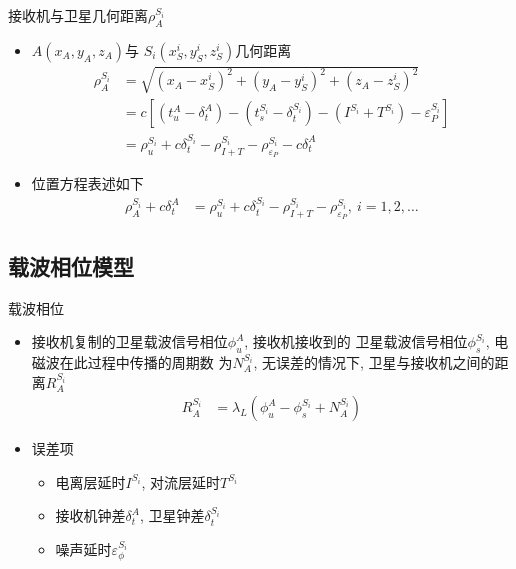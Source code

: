 \begin{frame}{接收机与卫星几何距离$\rho _ A ^ { S _ i }$}
    \begin{itemize}
        \item $A \left( x _ A, y _ A, z _ A \right)$与
        $S _ i \left( x _ S ^ i, y _ S ^ i, z _ S ^ i \right)$几何距离
        \begin{align*}
            \rho _ A ^ { S _ i } &= \sqrt{ \left( x _ A - x _ S ^ i \right) ^ 2 
            + \left( y _ A - y _ S ^ i \right) ^ 2 
            + \left( z _ A - z _ S ^ i \right) ^ 2 } \\
            &= c \left[ \left( t _ u ^ A - \delta _ t ^ A \right)
            - \left( t _ s ^ { S _ i } - \delta _ t ^ { S _ i } \right)
            - \left( I ^ { S _ i } + T ^ { S _ i } \right)
            - \varepsilon _ P ^ { S _ i } \right] \\
            &= \rho _ u ^ { S _ i } + c \delta _ t ^ { S _ i }
            - \rho _ { I + T } ^ { S _ i } - \rho _ {\varepsilon _ P} ^ { S _ i } - c \delta _ t ^ A
        \end{align*} \pause
        \item 位置方程表述如下
        \begin{align*}
            \rho _ A ^ { S _ i } + c \delta _ t ^ A &= \rho _ u ^ { S _ i } + c \delta _ t ^ { S _ i }
            - \rho _ { I + T } ^ { S _ i } - \rho _ {\varepsilon _ P} ^ { S _ i }, \ i = 1, 2, \ldots
        \end{align*}
    \end{itemize}
\end{frame}

\subsection{载波相位模型}
\begin{frame}{载波相位}
    \begin{itemize}
        \item 接收机复制的卫星载波信号相位$\phi _ u ^ A$, 接收机接收到的
        卫星载波信号相位$\phi _ s ^ { S _ i }$, 电磁波在此过程中传播的周期数
        为$N _ A ^ { S _ i }$, 无误差的情况下, 卫星与接收机之间的距离$R _ A ^ { S _ i }$
        \begin{align*}
            R _ A ^ { S _ i } &= \lambda _ L \left( \phi _ u ^ A 
            - \phi _ s ^ { S _ i } + N _ A ^ { S _ i } \right)
        \end{align*}
        \item 误差项
        \begin{itemize}
            \item 电离层延时$I ^ { S _ i }$, 对流层延时$T ^ { S _ i }$
            \item 接收机钟差$\delta _ t ^ A$, 卫星钟差$\delta _ t ^ { S _ i }$
            \item 噪声延时$\varepsilon _ \phi ^ { S _ i }$
        \end{itemize}
    \end{itemize}
\end{frame}

